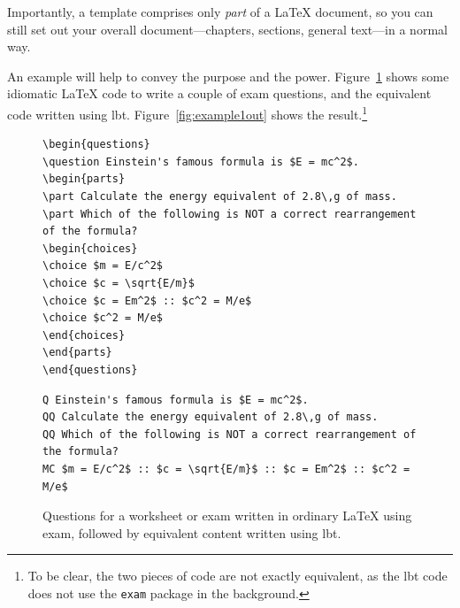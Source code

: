 \documentclass[11pt]{article}
\newcommand{\lbtlabel}{\textsf{lbt}}
\begin{document}
Importantly, a template comprises only \emph{part} of a \LaTeX{} document, so you can still set out your overall document---chapters, sections, general text---in a normal way.

An example will help to convey the purpose and the power. Figure~\ref{fig:example1code} shows some idiomatic \LaTeX{} code to write a couple of exam questions, and the equivalent code written using \lbtlabel{}. Figure~\ref{fig:example1out} shows the result.\footnote{To be clear, the two pieces of code are not exactly equivalent, as the \lbtlabel{} code does not use the \texttt{exam} package in the background.}


\begin{figure}
\begin{tcolorbox}
\small\color{blue!55}
\begin{verbatim}
\begin{questions}
\question Einstein's famous formula is $E = mc^2$.
\begin{parts}
\part Calculate the energy equivalent of 2.8\,g of mass.
\part Which of the following is NOT a correct rearrangement of the formula?
\begin{choices}
\choice $m = E/c^2$
\choice $c = \sqrt{E/m}$
\choice $c = Em^2$ :: $c^2 = M/e$
\choice $c^2 = M/e$
\end{choices}
\end{parts}
\end{questions}
\end{verbatim}
\tcblower
\small\color{blue!80}
\begin{verbatim}
Q Einstein's famous formula is $E = mc^2$.
QQ Calculate the energy equivalent of 2.8\,g of mass.
QQ Which of the following is NOT a correct rearrangement of the formula?
MC $m = E/c^2$ :: $c = \sqrt{E/m}$ :: $c = Em^2$ :: $c^2 = M/e$
\end{verbatim}
\end{tcolorbox}
\caption{Questions for a worksheet or exam written in ordinary \LaTeX{} using \textsf{exam}, followed by equivalent content written using \lbtlabel{}.}
\label{fig:example1code}
\end{figure}
\end{document}
